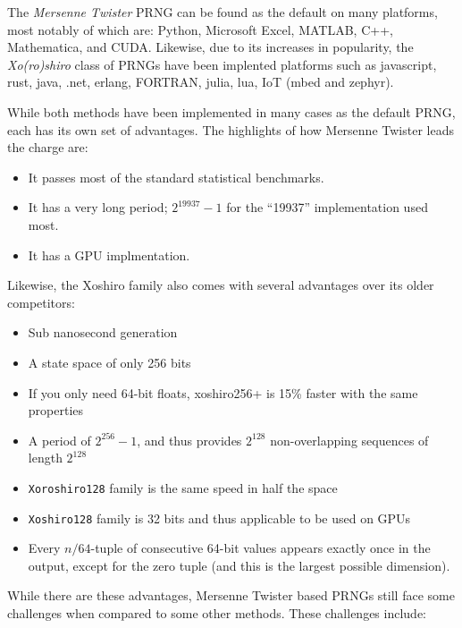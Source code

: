 \documentclass{article}
\begin{document}
        The \emph{Mersenne Twister} PRNG can be found as the default on many platforms, most notably of which are: Python\cite{Python}, Microsoft Excel\cite{Excel}, MATLAB\cite{MATLAB}, C++\cite{CppMT}, Mathematica\cite{Mathematica}, and CUDA\cite{CUDA}.  Likewise, due to its increases in popularity, the \emph{Xo(ro)shiro} class of PRNGs have been implented platforms such as javascript, rust, java, .net, erlang, FORTRAN, julia, lua, IoT (mbed and zephyr).

        While both methods have been implemented in many cases as the default PRNG, each has its own set of advantages. The highlights of how Mersenne Twister leads the charge are:

        \begin{itemize}
            \item It passes most of the standard statistical benchmarks\cite{TestU01}.
            \item It has a very long period; $2^{19937} - 1$ for the ``19937'' implementation used most.
            \item It has a GPU implmentation\cite{MTGP}.
        \end{itemize}

        Likewise, the Xoshiro family also comes with several advantages over its older competitors\cite{XoroshiroPaper, Shootout}:

        \begin{itemize}
            \item Sub nanosecond generation
            \item A state space of only 256 bits
            \item If you only need 64-bit floats, xoshiro256+ is 15\% faster with the same properties
            \item A period of $2^{256} - 1$, and thus provides $2^{128}$ non-overlapping sequences of length $2^{128}$
            \item \texttt{Xoroshiro128} family is the same speed in half the space
            \item \texttt{Xoshiro128} family is 32 bits and thus applicable to be used on GPUs
            \item Every $n/64$-tuple of consecutive 64-bit values appears exactly once in the output, except for the zero tuple (and this is the largest possible dimension).
        \end{itemize}

        While there are these advantages, Mersenne Twister based PRNGs still face some challenges when compared to some other methods.  These challenges include:
\end{document}
